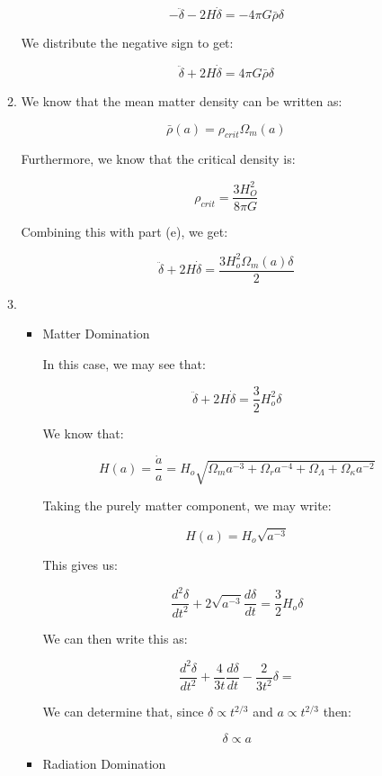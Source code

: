 \begin{enumerate}
\begin{enumerate}
          $$-\ddot{\delta}-2H\dot{\delta}=-4\pi G\bar{\rho}\delta$$

          We distribute the negative sign to get:

          $$\boxed{\ddot{\delta}+2H\dot{\delta}=4\pi G\bar{\rho}\delta}$$

      \item We know that the mean matter density can be written as:

        $$\bar{\rho}(a)=\rho_{crit}\Omega_m(a)$$

        Furthermore, we know that the critical density is:

        $$\rho_{crit}=\frac{3H_O^2}{8\pi G}$$

        Combining this with part (e), we get:

        $$\boxed{\ddot{\delta}+2H\dot{\delta}=\frac{3H_o^2\Omega_m(a)\delta}{2}}$$

      \item 

        \begin{itemize}

          \item Matter Domination

            In this case, we may see that:

            $$\ddot{\delta}+2H\dot{\delta}=\frac{3}{2}H_o^2\delta$$

            We know that:

            $$H(a)=\frac{\dot{a}}{a}=H_o\sqrt{\Omega_ma^{-3}+\Omega_ra^{-4}+\Omega_{\Lambda}+\Omega_{\kappa}a^{-2}}$$

            Taking the purely matter component, we may write:

            $$H(a)=H_o\sqrt{a^{-3}}$$

            This gives us:

            $$\frac{d^2\delta}{dt^2}+2\sqrt{a^{-3}}\frac{d\delta}{dt}=\frac{3}{2}H_o\delta$$

            We can then write this as:

            $$\frac{d^2\delta}{dt^2}+\frac{4}{3t}\frac{d\delta}{dt}-\frac{2}{3t^2}\delta=$$

            We can determine that, since $\delta\propto t^{2/3}$ and $a\propto t^{2/3}$ then:

            $$\boxed{\delta\propto a}$$

          \item Radiation Domination


\end{itemize}
\end{enumerate}
\end{enumerate}
